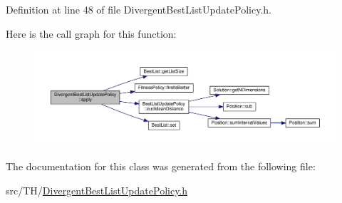 Definition at line 48 of file Divergent\+Best\+List\+Update\+Policy.\+h.



Here is the call graph for this function\+:
\nopagebreak
\begin{figure}[H]
\begin{center}
\leavevmode
\includegraphics[width=350pt]{classDivergentBestListUpdatePolicy_a793d47a0c458eef94b27fbee73e5df0e_cgraph}
\end{center}
\end{figure}




The documentation for this class was generated from the following file\+:\begin{DoxyCompactItemize}
\item 
src/\+T\+H/\hyperlink{DivergentBestListUpdatePolicy_8h}{Divergent\+Best\+List\+Update\+Policy.\+h}\end{DoxyCompactItemize}
